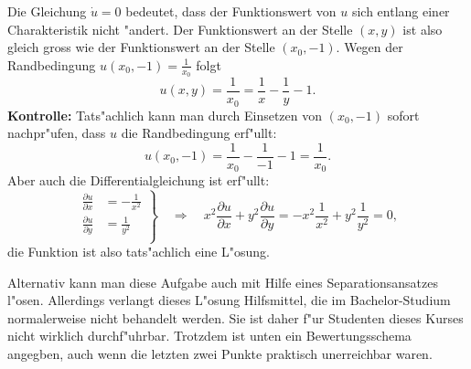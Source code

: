 \begin{loesung}
Die Gleichung $\dot u=0$ bedeutet, dass der Funktionswert von $u$ sich
entlang einer Charakteristik nicht "andert.
Der Funktionswert an der Stelle $(x,y)$ ist
also gleich gross wie der Funktionswert an der Stelle $(x_0,-1)$. Wegen der
Randbedingung $u(x_0,-1)=\frac1{x_0}$ folgt
\[
u(x,y)=\frac1{x_0}=\frac1x-\frac1y-1.
\]
{\bf Kontrolle:}
Tats"achlich kann man durch Einsetzen von $(x_0,-1)$ sofort nachpr"ufen,
dass $u$ die Randbedingung erf"ullt:
\[
u(x_0,-1)=\frac1{x_0}-\frac1{-1}-1=\frac1{x_0}.
\]
Aber auch die Differentialgleichung ist erf"ullt:
\[
\left.
\begin{aligned}
\frac{\partial u}{\partial x}&=-\frac1{x^2}\\
\frac{\partial u}{\partial y}&=\frac1{y^2}\\
\end{aligned}
\right\}
\quad\Rightarrow\quad
x^2\frac{\partial u}{\partial x}+y^2\frac{\partial u}{\partial y}
=
-x^2\frac1{x^2}+y^2\frac1{y^2}
=
0,
\]
die Funktion ist also tats"achlich eine L"osung.

\medskip

Alternativ kann man diese Aufgabe auch mit Hilfe eines Separationsansatzes
l"osen. Allerdings verlangt dieses L"osung Hilfsmittel, die im Bachelor-Studium
normalerweise nicht behandelt werden. Sie ist daher f"ur Studenten dieses
Kurses nicht wirklich durchf"uhrbar. Trotzdem ist unten ein Bewertungsschema
angegben, auch wenn die letzten zwei Punkte praktisch unerreichbar waren.

\medskip


\end{loesung}
